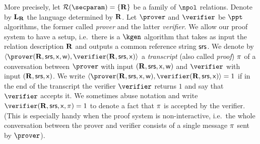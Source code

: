 \documentclass[runningheads,11pt]{llncs}
\begin{document}
More precisely, let $\RELGEN(\secparam) = \smallset{\REL}$ be a family of
$\npol$ relations. Denote by $\mathbf{L}_{\mathbf{R}}$ the language determined by $\mathbf{R}$. Let
$\prover$ and $\verifier$ be $\ppt$ algorithms, the former called \emph{prover}
and the latter \emph{verifier}. We allow our proof system to have a setup,
i.e.~there is a $\kgen$ algorithm that takes as input the relation description
$\mathbf{R}$ and outputs a common reference string $\mathsf{srs}$. We denote by
$\ip{\prover(\REL, \srs, \inp, \wit)}{\verifier(\REL, \srs,\inp)}$ a
\emph{transcript} (also called \emph{proof}) $\pi$ of a conversation
between $\prover$ with input $(\mathbf{R}, \mathsf{srs}, \mathsf{x}, \mathsf{w})$ and $\verifier$ with
input $(\mathbf{R}, \mathsf{srs}, \mathsf{x})$. We write
$\ip{\prover (\REL, \srs, \inp, \wit)}{\verifier(\REL, \srs, \inp)} = 1$ if in
the end of the transcript the verifier $\verifier$ returns $1$ and say that
$\verifier$ accepts it. We sometimes abuse notation and write
$\verifier(\REL, \srs, \inp, \zkproof) = 1$ to denote a fact that $\pi$ is
accepted by the verifier. (This is especially handy when the proof system is
non-interactive, i.e.~the whole conversation between the prover and verifier
consists of a single message $\pi$ sent by $\prover$).
\end{document}

